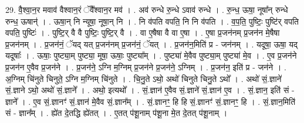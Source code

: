 \documentclass[17pt]{extarticle}
\begin{document}
29. वै॒श्वा॒न॒र मवाव॑ वैश्वान॒रं ॅवै᳚श्वान॒र मव॑ । . अव॑ रुन्धे रु॒न्धे ऽवाव॑ रुन्धे । . रु॒न्ध॒ ऊषा॒ नूषा᳚न् रुन्धे रुन्ध॒ ऊषान्॑ । . ऊषा॒न् नि न्यूषा॒ नूषा॒न् नि । . नि व॑पति वपति॒ नि नि व॑पति । . व॒प॒ति॒ पुष्टिः॒ पुष्टि॑र् वपति वपति॒ पुष्टिः॑ । . पुष्टि॒र् वै वै पुष्टिः॒ पुष्टि॒र् वै । . वा ए॒षैषा वै वा ए॒षा । . ए॒षा प्र॒जन॑नम् प्र॒जन॑न मे॒षैषा प्र॒जन॑नम् । . प्र॒जन॑नं॒ ॅयद् यत् प्र॒जन॑नम् प्र॒जन॑नं॒ ॅयत् । . प्र॒जन॑न॒मिति॑ प्र - जन॑नम् । . यदूषा॒ ऊषा॒ यद् यदूषाः᳚ । . ऊषाः॒ पुष्ट्या॒म् पुष्ट्या॒ मूषा॒ ऊषाः॒ पुष्ट्या᳚म् । . पुष्ट्या॑ मे॒वैव पुष्ट्या॒म् पुष्ट्या॑ मे॒व । . ए॒व प्र॒जन॑ने प्र॒जन॑न ए॒वैव प्र॒जन॑ने । . प्र॒जन॑ने॒ ऽग्नि म॒ग्निम् प्र॒जन॑ने प्र॒जन॑ने॒ ऽग्निम् । . प्र॒जन॑न॒ इति॑ प्र - जन॑ने । . अ॒ग्निम् चि॑नुते चिनुते॒ ऽग्नि म॒ग्निम् चि॑नुते । . चि॒नु॒ते ऽथो॒ अथो॑ चिनुते चिनु॒ते ऽथो᳚ । . अथो॑ सं॒.ज्ञाने॑ सं॒.ज्ञाने ऽथो॒ अथो॑ सं॒.ज्ञाने᳚ । . अथो॒ इत्यथो᳚ । . सं॒.ज्ञान॑ ए॒वैव सं॒.ज्ञाने॑ सं॒.ज्ञान॑ ए॒व । . सं॒.ज्ञान॒ इति॑ सं - ज्ञाने᳚ । . ए॒व सं॒.ज्ञानꣳ॑ सं॒.ज्ञान॑ मे॒वैव सं॒.ज्ञान᳚म् । . सं॒.ज्ञानꣳ॒॒ हि हि सं॒.ज्ञानꣳ॑ सं॒.ज्ञानꣳ॒॒ हि । . सं॒.ज्ञान॒मिति॑ सं - ज्ञान᳚म् । . ह्ये॑त दे॒तद्धि ह्ये॑तत् । . ए॒तत् प॑शू॒नाम् प॑शू॒ना मे॒त दे॒तत् प॑शू॒नाम् । \newline
\end{document}
